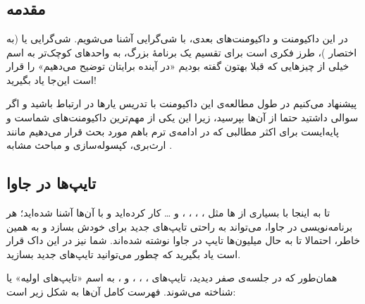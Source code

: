 \chapter{\DocTitle}
\section{مقدمه}

در این داکیومنت و داکیومنت‌های بعدی، با شی‌گرایی آشنا می‌شویم. شی‌گرایی یا
 (به اختصار  )، طرز فکری است
برای تقسیم یک برنامهٔ بزرگ، به واحدهای کوچک‌تر به اسم  خیلی از
چیزهایی که قبلا بهتون گفته بودیم «در آینده برایتان توضیح می‌دهیم» را قرار
است این‌جا یاد بگیرید!

پیشنهاد می‌کنیم در طول مطالعه‌ی این داکیومنت با تدریس یارها در ارتباط
باشید و اگر سوالی داشتید حتما از آن‌ها بپرسید، زیرا این یکی از مهم‌ترین
داکیومنت‌های شماست و پایه‌ایست برای اکثر مطالبی که در ادامه‌ی ترم باهم مورد
بحث قرار می‌دهیم مانند ارث‌بری، کپسوله‌سازی و مباحث مشابه .

\section{تایپ‌ها در جاوا}

تا به اینجا با بسیاری از  ها مثل  ،
 ،  ،  ،
 و \ldots{} کار کرده‌اید و با آن‌ها آشنا شده‌اید؛ هر
برنامه‌نویسی در جاوا، می‌تواند به راحتی تایپ‌های جدید برای خودش بسازد و به
همین خاطر، احتمالا تا به حال میلیون‌ها تایپ در جاوا نوشته شده‌اند. شما نیز
در این داک قرار است یاد بگیرید که چطور می‌توانید تایپ‌های جدید بسازید.

همان‌طور که در جلسه‌ی صفر دیدید، تایپ‌های  ،
 ،  ،  و
 ، به اسم «تایپ‌های اولیه» یا 
شناخته می‌شوند. فهرست کامل آن‌ها به شکل زیر است:

